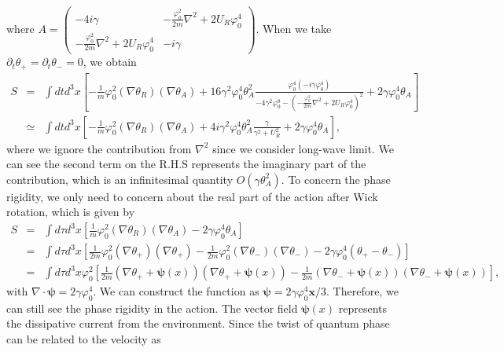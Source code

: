 \documentclass[aps,superscriptaddress,notitlepage,longbibliography]{revtex4-1}
\begin{document}
where $A=\left(\begin{array}{cc}
-4i\gamma & -\frac{\varphi_{0}^{2}}{2m}\nabla^{2}+2U_{R}\varphi_{0}^{4}\\
-\frac{\varphi_{0}^{2}}{2m}\nabla^{2}+2U_{R}\varphi_{0}^{4} & -i\gamma
\end{array}\right)$. When we take $\partial_{t}\theta_{+}=\partial_{t}\theta_{-}=0$,
we obtain 
\begin{eqnarray}
S & = & \int dtd^{3}x\left[-\frac{1}{m}\varphi_{0}^{2}(\nabla\theta_{R})(\nabla\theta_{A})+16\gamma^{2}\varphi_{0}^{4}\theta_{A}^{2}\frac{\varphi_{0}^{4}(-i\gamma\varphi_{0}^{4})}{-4\gamma^{2}\varphi_{0}^{8}-\left(-\frac{\varphi_{0}^{2}}{2m}\nabla^{2}+2U_{R}\varphi_{0}^{4}\right)^{2}}+2\gamma\varphi_{0}^{4}\theta_{A}\right]\nonumber \\
 & \simeq & \int dtd^{3}x\left[-\frac{1}{m}\varphi_{0}^{2}(\nabla\theta_{R})(\nabla\theta_{A})+4i\gamma^{2}\varphi_{0}^{4}\theta_{A}^{2}\frac{\gamma}{\gamma^{2}+U_{R}^{2}}+2\gamma\varphi_{0}^{4}\theta_{A}\right],
\end{eqnarray}
where we ignore the contribution from $\nabla^{2}$ since we consider
long-wave limit. We can see the second term on the R.H.S represents
the imaginary part of the contribution, which is an infinitesimal
quantity $O(\gamma\theta_{A}^{2})$. To concern the phase rigidity,
we only need to concern about the real part of the action after Wick
rotation, which is given by 
\begin{eqnarray}
S & = & \int d\tau d^{3}x\left[\frac{1}{m}\varphi_{0}^{2}(\nabla\theta_{R})(\nabla\theta_{A})-2\gamma\varphi_{0}^{4}\theta_{A}\right]\nonumber \\
 & = & \int d\tau d^{3}x\left[\frac{1}{2m}\varphi_{0}^{2}(\nabla\theta_{+})(\nabla\theta_{+})-\frac{1}{2m}\varphi_{0}^{2}(\nabla\theta_{-})(\nabla\theta_{-})-2\gamma\varphi_{0}^{4}(\theta_{+}-\theta_{-})\right]\nonumber \\
 & = & \int d\tau d^{3}x\varphi_{0}^{2}\left[\frac{1}{2m}(\nabla\theta_{+}+\bm{\psi}(x))(\nabla\theta_{+}+\bm{\psi}(x))-\frac{1}{2m}(\nabla\theta_{-}+\bm{\psi}(x))(\nabla\theta_{-}+\bm{\psi}(x))\right],\label{action-superfluid}
\end{eqnarray}
with $\nabla\cdot\bm{\psi}=2\gamma\varphi_{0}^{4}$. We can construct
the function as $\bm{\psi}=2\gamma\varphi_{0}^{4}\bm{x}/3$. Therefore,
we can still see the phase rigidity in the action. The vector field
$\bm{\psi}(x)$ represents the dissipative current from the environment.
Since the twist of quantum phase can be related to the velocity as
\end{document}
